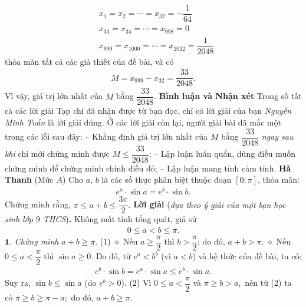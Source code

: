 \begin{multicols}{2}
\begin{align*}
		&{x_1} = {x_2} =  \cdots  = {x_{32}} =  - \dfrac{1}{{64}}\\[-0.7ex]
		&{x_{33}} = {x_{34}} =  \cdots  = {x_{998}} = 0\\[-0.7ex]
		&{x_{999}} = {x_{1000}} =  \cdots  = {x_{2022}} = \dfrac{1}{{2048}}
	\end{align*}
	thỏa mãn tất cả các giả thiết của đề bài, và có
	\begin{align*}
		M = {x_{999}} - {x_{32}} = \dfrac{{33}}{{2048}}.
	\end{align*}
	Vì vậy, giá trị lớn nhất của $M$ bằng  $\dfrac{{33}}{{2048}}$.
	\vskip 0.05cm
	\textbf{\color{thachthuctoanhoc}Bình luận và Nhận xét}
	\vskip 0.05cm
	Trong số tất cả các lời giải Tạp chí đã nhận được từ bạn đọc, chỉ có lời giải của bạn \textit{Nguyễn Minh Tuấn} là lời giải đúng. Ở các lời giải còn lại, người giải bài đã mắc một trong các lỗi sau đây:
	\vskip 0.05cm
	-- Khẳng định giá trị lớn nhất của $M$ bằng $\dfrac{33}{2048}$  \textit{ngay sau khi} chỉ mới chứng minh được  $M \le \dfrac{{33}}{{2048}}$;
	\vskip 0.05cm
	-- Lập luận luẩn quẩn, dùng điều muốn chứng minh để chứng minh chính điều đó;
	\vskip 0.05cm
	-- Lập luận mang tính cảm tính.
	\vskip 0.1cm
	\hfill\textbf{\color{thachthuctoanhoc}Hà Thanh}
	\vskip 0.1cm
	{}
	(Mức $A$)
	Cho $a$, $b$ là các số thực phân biệt thuộc đoạn $[0; \pi]$, thỏa mãn: 
	\begin{align*}
		{e^a} \cdot \sin a = {e^b} \cdot \sin b. 
	\end{align*} 
	Chứng minh rằng,  $\pi  \le a + b \le \dfrac{{3\pi }}{2}.$ 
	\vskip 0.05cm
	\textbf{\color{thachthuctoanhoc}Lời giải} (\textit{dựa theo ý giải của một bạn học sinh lớp $9$ THCS})\textbf{\color{thachthuctoanhoc}.}
	\vskip 0.05cm
	Không mất tính tổng quát, giả sử  
	\begin{align*}
		0 \le a < b \le \pi .
	\end{align*}
	$\pmb{1.}$ \textit{Chứng minh} $a + b \ge \pi.$ \hfill ($1$)
	\vskip 0.05cm 
	$\diamond$ Nếu $a \ge \dfrac{\pi}{2}$  thì $b > \dfrac{\pi}{2}$;  do đó, $a + b > \pi$.
	\vskip 0.05cm 
	$\diamond$ Nếu $0 \le a < \dfrac{\pi}{2}$ thì $\sin a \ge 0$. Do đó, từ $e^a < b^b$  (vì $a < b$) và hệ thức của đề bài, ta có:
	\begin{align*}
		{e^b} \cdot \sin b = {e^a} \cdot \sin a \le {e^b} \cdot \sin a.
	\end{align*}
	Suy ra, $\sin b \le \sin a$ (do $e^b > 0$). \hfill ($2$)
	\vskip 0.05cm
	Vì $0 \le a < \dfrac{\pi }{2}$  và $\pi  \ge b > a,$  nên từ ($2$) ta có $\pi  \ge b \ge \pi  - a;$   do đó, $a+b \ge \pi$.

\end{multicols}
